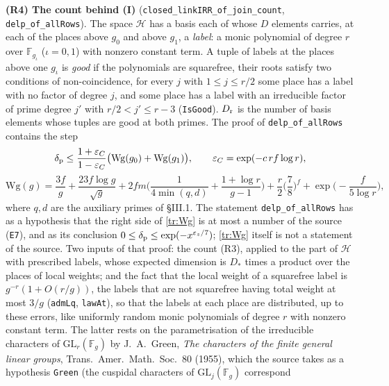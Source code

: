 \documentclass[11pt,letterpaper]{article}
\begin{document}
\textbf{(R4) The count behind \textup{(I)}} (\texttt{closed\_linkIRR\_of\_join\_count}, \texttt{delp\_of\_allRows}).
The space $\mathcal H$ has a basis each of whose $D$ elements carries, at each of the places above $g_0$ and
above $g_1$, a \emph{label}: a monic polynomial of degree $r$ over $\mathbb F_{g_\iota}$ ($\iota=0,1$) with nonzero constant term.
A tuple of labels at the places above one $g_\iota$ is \emph{good} if the polynomials are squarefree, their roots
satisfy two conditions of non-coincidence, for every $j$ with $1\le j\le r/2$ some place has a label with no
factor of degree $j$, and some place has a label with an irreducible factor of prime degree $j'$ with
$r/2<j'\le r-3$ (\texttt{IsGood}). $D_{\rm r}$ is the number of basis elements whose tuples are good at both
primes. The proof of \texttt{delp\_of\_allRows} contains the step
\begin{equation}\label{tr:Wg}
 \delta_{\rm p}\le\frac{1+\varepsilon_C}{1-\varepsilon_C}\big(\mathrm{Wg}(g_0)+\mathrm{Wg}(g_1)\big),\qquad \varepsilon_C=\exp(-c\,rf\log r),
\end{equation}
\begin{equation}\label{D:326}
 \mathrm{Wg}(g)=\frac{3f}g+\frac{23f\log g}{\sqrt g}+2fm\Big(\frac1{4\min(q,d)}+\frac{1+\log r}{g-1}\Big)
      +\frac r2\Big(\frac78\Big)^f+\exp\Big(-\frac f{5\log r}\Big),
\end{equation}
where $q,d$ are the auxiliary primes of \S III.1. The statement \texttt{delp\_of\_allRows} has as a
hypothesis that the right side of \eqref{tr:Wg} is at most a number of the source (\texttt{E7}), and
as its conclusion $0\le\delta_{\rm p}\le\exp(-x^{\varepsilon_z/7})$; \eqref{tr:Wg} itself is not a statement of the
source. Two inputs of that proof: the count (R3), applied to the part of
$\mathcal H$ with prescribed labels, whose expected dimension is $D_*$ times a product over the places of
local weights; and the fact that the local weight of a squarefree label is $g^{-r}(1+O(r/g))$, the labels
that are not squarefree having total weight at most $3/g$ (\texttt{admLq}, \texttt{lawAt}), so that the labels at each place are distributed, up to these errors, like uniformly random monic polynomials of degree $r$ with nonzero constant term. The latter
rests on the parametrisation of the irreducible characters of $\mathrm{GL}_r(\mathbb F_g)$ by J.~A.~Green,
\emph{The characters of the finite general linear groups}, Trans.\ Amer.\ Math.\ Soc.\ 80 (1955), which the
source takes as a hypothesis \texttt{Green} (the cuspidal characters of $\mathrm{GL}_j(\mathbb F_g)$ correspond
\end{document}
